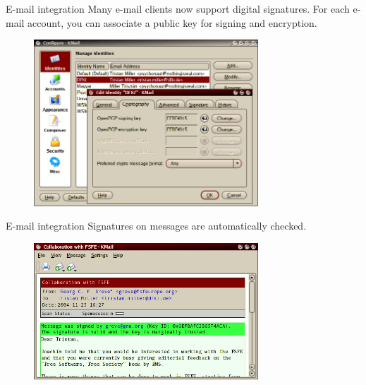\documentclass[%
mode=present,%
paper=smartboard,
size=20pt,
]{powerdot}
\begin{document}
\begin{slide}{E-mail integration}
  Many e-mail clients now support digital signatures.  For each e-mail
  account, you can associate a public key for signing and encryption.
  \begin{figure}[H]
    \centering
    \includegraphics[width=0.75\textwidth]{kmail_conf}
    \label{fig:kmail_conf}
  \end{figure}
\end{slide}

\begin{slide}[toc=]{E-mail integration}
  Signatures on messages are automatically checked.
  \begin{figure}[H]
    \centering
    \includegraphics[width=0.75\textwidth]{kmail_recvd}
    \label{fig:kmail_recvd}
  \end{figure}
\end{slide}
\end{document}
